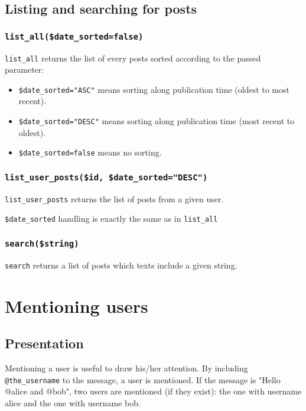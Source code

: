 \documentclass[twoside,a4paper,12pt]{article}
\begin{document}
\subsection{Listing and searching for posts}

\subsubsection{\texttt{list\_all(\$date\_sorted=false)}}

\texttt{list\_all} returns the list of every posts sorted according to the passed parameter:

\begin{itemize}
\item \texttt{\$date\_sorted="ASC"} means sorting along publication time (oldest to most recent).
\item \texttt{\$date\_sorted="DESC"} means sorting along publication time (most recent to oldest).
\item \texttt{\$date\_sorted=false} means no sorting.
\end{itemize}

\subsubsection{\texttt{list\_user\_posts(\$id, \$date\_sorted="DESC")}}

\texttt{list\_user\_posts} returns the list of posts from a given user.

\texttt{\$date\_sorted} handling is exactly the same as in \texttt{list\_all}

\subsubsection{\texttt{search(\$string)}}

\texttt{search} returns a list of posts which texts include a given string.

\section{Mentioning users}

\subsection{Presentation}

Mentioning a user is useful to draw his/her attention. By including \texttt{@the\_username} to the message, a user is mentioned. If the message is "Hello @alice and @bob", two users are mentioned (if they exist): the one with username alice and the one with username bob.
\end{document}
